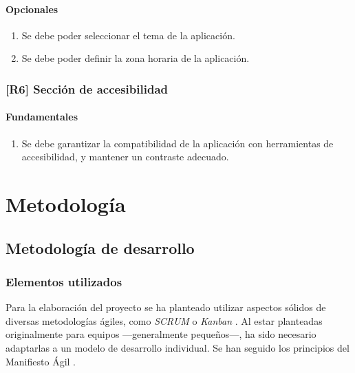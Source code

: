 \documentclass[10pt, a4paper]{aqademic}
\begin{document}
\subsubsection*{Opcionales}

\begin{enumerate}[label=\textbf{R5.\arabic*o}, leftmargin=10mm]
	\item Se debe poder seleccionar el tema de la aplicación.
	
	\item Se debe poder definir la zona horaria de la aplicación.	
\end{enumerate}


\subsection*{[R6] Sección de accesibilidad}

\subsubsection*{Fundamentales}

\begin{enumerate}[label=\textbf{R6.\arabic*f}, leftmargin=10mm]
	\item Se debe garantizar la compatibilidad de la aplicación con herramientas de accesibilidad, y mantener un contraste adecuado.
\end{enumerate}


\chapter{Metodología}

\section{Metodología de desarrollo}

\subsection{Elementos utilizados}

Para la elaboración del proyecto se ha planteado utilizar aspectos sólidos de diversas metodologías ágiles, como \textit{SCRUM} \cite{schwaber2017scrum} o \textit{Kanban} \cite{kanban}. Al estar planteadas originalmente para equipos ---generalmente pequeños---, ha sido necesario adaptarlas a un modelo de desarrollo individual. Se han seguido los principios del Manifiesto Ágil \cite{beck2001agile}.
\end{document}
